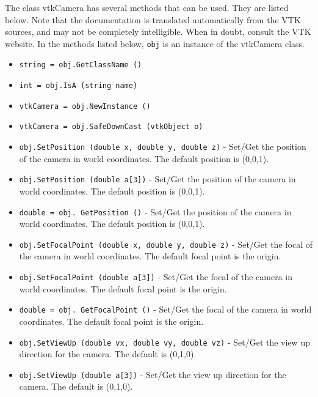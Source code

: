 The class vtkCamera has several methods that can be used.
  They are listed below.
Note that the documentation is translated automatically from the VTK sources,
and may not be completely intelligible.  When in doubt, consult the VTK website.
In the methods listed below, \verb|obj| is an instance of the vtkCamera class.
\begin{itemize}
\item  \verb|string = obj.GetClassName ()|

\item  \verb|int = obj.IsA (string name)|

\item  \verb|vtkCamera = obj.NewInstance ()|

\item  \verb|vtkCamera = obj.SafeDownCast (vtkObject o)|

\item  \verb|obj.SetPosition (double x, double y, double z)| -  Set/Get the position of the camera in world coordinates.
 The default position is (0,0,1).

\item  \verb|obj.SetPosition (double a[3])| -  Set/Get the position of the camera in world coordinates.
 The default position is (0,0,1).

\item  \verb|double = obj. GetPosition ()| -  Set/Get the position of the camera in world coordinates.
 The default position is (0,0,1).

\item  \verb|obj.SetFocalPoint (double x, double y, double z)| -  Set/Get the focal of the camera in world coordinates.
 The default focal point is the origin.

\item  \verb|obj.SetFocalPoint (double a[3])| -  Set/Get the focal of the camera in world coordinates.
 The default focal point is the origin.

\item  \verb|double = obj. GetFocalPoint ()| -  Set/Get the focal of the camera in world coordinates.
 The default focal point is the origin.

\item  \verb|obj.SetViewUp (double vx, double vy, double vz)| -  Set/Get the view up direction for the camera.  The default
 is (0,1,0).

\item  \verb|obj.SetViewUp (double a[3])| -  Set/Get the view up direction for the camera.  The default
 is (0,1,0).


\end{itemize}
